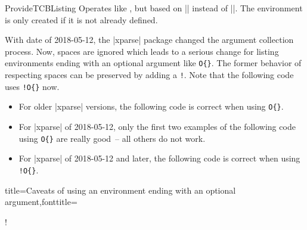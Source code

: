 \begin{docCommand}{ProvideTCBListing}{}
  Operates like , but based on |\ProvideDocumentEnvironment| instead of |\DeclareDocumentEnvironment|.
  The environment  is only created if it is not already defined.
\end{docCommand}

\clearpage


\begin{marker}
With date of 2018-05-12, the |xparse| \cite{latexproject:xparse} package
changed the argument collection process.
Now, spaces are ignored which leads to a serious change for listing environments
ending with an optional argument like \verb+O{}+.
The former behavior of respecting spaces can be preserved by adding a \flqq\verb+!+\frqq.
Note that the following code uses \verb+!O{}+ now.
\begin{itemize}
\item For older |xparse| versions, the following code is correct when using \verb+O{}+.
\item For |xparse| of 2018-05-12, only the first two examples of
  the following code using \verb+O{}+ are really \flqq good\frqq\ -- all others do not work.
\item For |xparse| of 2018-05-12 and later, the following code is correct when using \verb+!O{}+.
\end{itemize}
\end{marker}





\begin{dispListing*}{title={Caveats of using an environment ending with an
  optional argument},fonttitle=\bfseries}

\begin{mybox}[colframe=red]
\good
\end{mybox}

\begin{mybox}[colframe=red]\good\end{mybox}

\begin{mybox}
\good
\end{mybox}

\begin{mybox} \good\end{mybox}

\begin{mybox}\bad!\end{mybox}

\begin{mybox}
[\good]
\end{mybox}

\begin{mybox} [\good]\end{mybox}

\begin{mybox}[\bad!]\end{mybox}
\end{dispListing*}

